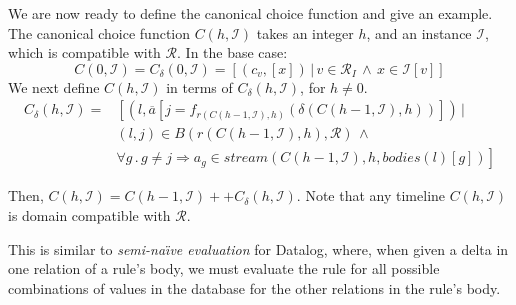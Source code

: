 We are now ready to define the canonical choice function and give an example.  The canonical choice function $C(h, \mathcal{I})$ takes an integer $h$, and an instance $\mathcal{I}$, which is compatible with $\mathcal{R}$.  In the base case:
$$C(0,\mathcal{I}) = C_\delta(0,\mathcal{I}) =  [(c_v,[x]) \, | \, v \in \mathcal{R}_I \, \land \, x \in \mathcal{I}[v]]$$
We next define $C(h,\mathcal{I})$ in terms of $C_\delta(h,\mathcal{I})$, for $h \neq 0$.
\begin{equation*}
\begin{split}
C_\delta(h,\mathcal{I}) = & \left[ (l, \overline{a}[j =  f_{r(C(h-1,\mathcal{I}),h)}(\delta(C(h-1,\mathcal{I}),h))]) \, | \right. \\
& \left. (l,j) \in B(r(C(h-1,\mathcal{I}),h), \mathcal{R}) \, \land \right. \\
& \left. \forall g \, . \, g \neq j \Rightarrow a_g \in stream(C(h-1,\mathcal{I}),h,bodies(l)[g]) \right]
\end{split}
\end{equation*}

Then, $ C(h,\mathcal{I}) = C(h-1,\mathcal{I}) ++ C_\delta(h,\mathcal{I})$.
Note that any timeline $C(h,\mathcal{I})$ is domain compatible with $\mathcal{R}$.

This is similar to {\em semi-na\"{\i}ve evaluation} for Datalog, where, when given a delta in one relation of a rule's body, we must evaluate the rule for all possible combinations of values in the database for the other relations in the rule's body.

